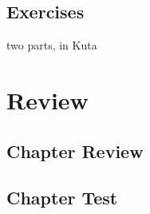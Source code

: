 \subsection{Exercises}
two parts, in Kuta



\newpage
\section{Review}
\subsection{Chapter Review}
\subsection{Chapter Test}


